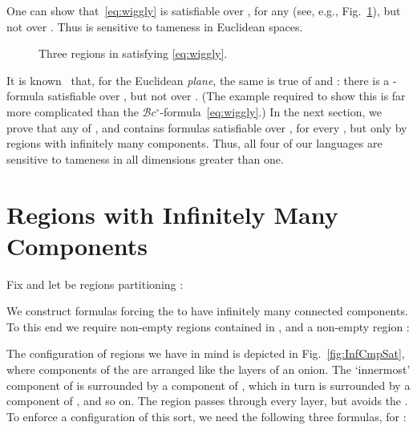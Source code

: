 \documentclass{article}
\newcommand{\cBci}{\ensuremath{\mathcal{B}c^\circ}}
\begin{document}
One can show that~\eqref{eq:wiggly} is satisfiable over ,
for any  (see, e.g., Fig.~\ref{fig:wiggly}), but not over
. Thus  is sensitive to tameness in Euclidean
spaces.
\begin{figure}[ht]
\begin{center}
\end{center}\vspace*{-3mm}
\caption{Three regions in  satisfying \eqref{eq:wiggly}.}
\label{fig:wiggly}
\end{figure}
It is known~\cite{ijcai:kphz10} that, for the Euclidean {\em plane},
the same is true of  and : there is a -formula
satisfiable over , but not over . (The 
example required to show this is far more complicated than the
\cBci-formula~\eqref{eq:wiggly}.)  In the next section, we prove that
any of ,  and  contains formulas satisfiable
over , for every , but only by regions with
infinitely many components. Thus, all four of our languages are
sensitive to tameness in all dimensions greater than one.





\section{Regions with Infinitely Many Components}\label{sec:sensitivity}

Fix  and let  be regions partitioning :

We construct formulas forcing the  to have infinitely many
connected components. To this end we require non-empty regions 
contained in , and a non-empty region :

The configuration of regions we have in mind is depicted in
Fig.~\ref{fig:InfCmpSat}, where components of the  are arranged
like the layers of an onion. The `innermost' component of  is
surrounded by a component of , which in turn is surrounded by a
component of , and so on. The region  passes through every
layer, but avoids the . To enforce a configuration of this sort,
we need the following three formulas, for :
\end{document}
